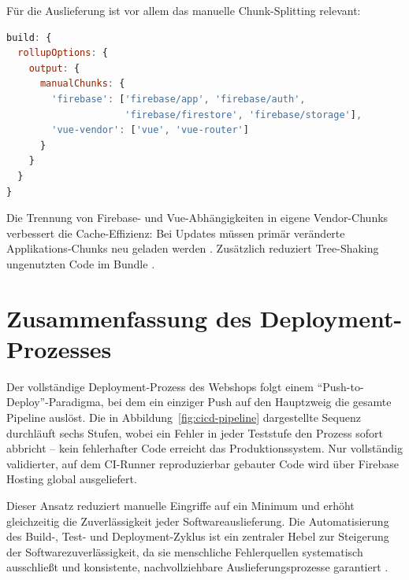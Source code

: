 Für die Auslieferung ist vor allem das manuelle Chunk-Splitting relevant:

\begin{lstlisting}[language=JavaScript, caption=Ausschnitt aus der Vite-Konfiguration (manualChunks), label=lst:vite-config]
build: {
  rollupOptions: {
    output: {
      manualChunks: {
        'firebase': ['firebase/app', 'firebase/auth',
                     'firebase/firestore', 'firebase/storage'],
        'vue-vendor': ['vue', 'vue-router']
      }
    }
  }
}
\end{lstlisting}

Die Trennung von Firebase- und Vue-Abhängigkeiten in eigene Vendor-Chunks verbessert die Cache-Effizienz: Bei Updates müssen primär veränderte Applikations-Chunks neu geladen werden \cite{nguyen2024vite}. Zusätzlich reduziert Tree-Shaking ungenutzten Code im Bundle \cite{vite2025}.

\section{Zusammenfassung des Deployment-Prozesses}
\label{sec:deployment-zusammenfassung}

Der vollständige Deployment-Prozess des Webshops folgt einem \enquote{Push-to-Deploy}-Paradigma, bei dem ein einziger Push auf den Hauptzweig die gesamte Pipeline auslöst. Die in Abbildung~\ref{fig:cicd-pipeline} dargestellte Sequenz durchläuft sechs Stufen, wobei ein Fehler in jeder Teststufe den Prozess sofort abbricht -- kein fehlerhafter Code erreicht das Produktionssystem. Nur vollständig validierter, auf dem CI-Runner reproduzierbar gebauter Code wird über Firebase Hosting global ausgeliefert.

Dieser Ansatz reduziert manuelle Eingriffe auf ein Minimum und erhöht gleichzeitig die Zuverlässigkeit jeder Softwareauslieferung. Die Automatisierung des Build-, Test- und Deployment-Zyklus ist ein zentraler Hebel zur Steigerung der Softwarezuverlässigkeit, da sie menschliche Fehlerquellen systematisch ausschließt und konsistente, nachvollziehbare Auslieferungsprozesse garantiert \cite{ugwueze2024, patel2025}.
